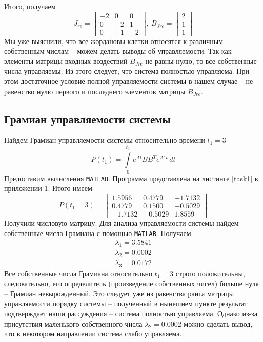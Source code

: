 \documentclass[a4paper, 12pt]{article}
\begin{document}
    Итого, получаем
    $$
    J_{re}=\begin{bmatrix}
        -2 &0 &0\\
        0 &-2 &1\\
        0 &-1 &-2
    \end{bmatrix},\
    B_{Jre}=\begin{bmatrix}
        2\\
        1\\
        1
    \end{bmatrix}
    $$
    Мы уже выяснили, что все жордановы клетки относятся к различным собственным числам -- можем делать выводы об управляемости.
    Так как элементы матрицы входных воздествий $B_{Jre}$ не равны нулю, то все собственные числа управляемы. Из этого следует, что
    система полностью управляема. При этом достаточное условие полной управляемости системы в нашем случае -- не равенство нулю
    первого и последнего элементов матрицы $B_{Jre}$.


    \subsection{Грамиан управляемости системы}
    Найдем Грамиан управляемости системы относительно времени $t_1=3$
    $$P(t_1)=\int\limits_{0}^{t_1}e^{At}BB^Te^{A^Tt}\,dt$$
    Предоставим вычисления \texttt{MATLAB}. Программа представлена на листинге \ref{task1} в приложении 1. Итого имеем
    $$P(t_1=3)=\begin{bmatrix}
    1.5956    &0.4779   &-1.7132\\
    0.4779    &0.1500   &-0.5029\\
   -1.7132   &-0.5029    &1.8559
    \end{bmatrix}$$
    Получили числовую матрицу. Для анализа управляемости системы найдем собственные числа Грамиана с помощью \texttt{MATLAB}. Получаем
    \begin{align*}
    \lambda_1=3.5841\\
    \lambda_2=0.0002\\
    \lambda_3=0.0172
    \end{align*}
    Все собственные числа Грамиана относительно $t_1=3$ строго положительны, следовательно, его определитель (произведение собственных чисел) больше нуля -- Грамиан невырожденный.
    Это следует уже из равенства ранга матрицы управляемости порядку системы -- полученный в нынешнем пункте результат подтверждает наши рассуждения -- система полностью управляема.
    Однако из-за присутствия маленького собственного числа $\lambda_2=0.0002$ можно сделать вывод, что в некотором направлении система слабо управляема.
\end{document}
